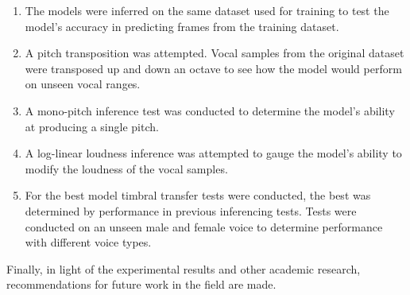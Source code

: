 \begin{enumerate}
    \item The models were inferred on the same dataset used for training to test the model's accuracy in predicting frames from the training dataset.
    \item A pitch transposition was attempted. Vocal samples from the original dataset were transposed up and down an octave to see how the model would perform on unseen vocal ranges.
    \item A mono-pitch inference test was conducted to determine the model's ability at producing a single pitch.
    \item A log-linear loudness inference was attempted to gauge the model's ability to modify the loudness of the vocal samples.
    \item For the best model timbral transfer tests were conducted, the best was determined by performance in previous inferencing tests. Tests were conducted on an unseen male and female voice to determine performance with different voice types.
\end{enumerate}

Finally, in light of the experimental results and other academic research, recommendations for future work in the field are made.